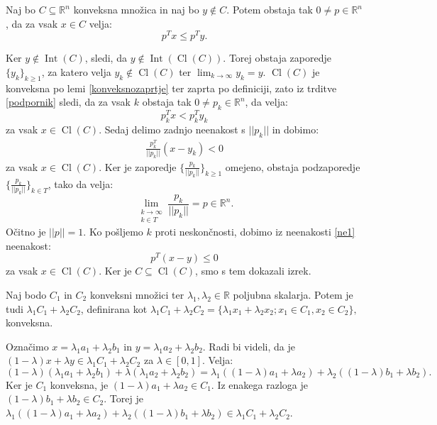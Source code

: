 \documentclass[mat1]{fmfdelo}
\newcommand{\R}{\mathbb R}
\DeclareMathOperator{\Int}{Int}
\DeclareMathOperator{\Cl}{Cl}
\begin{document}
\begin{izrek}
	Naj bo $C\subseteq \R^n$ konveksna množica in naj bo $y \notin C$. Potem obstaja tak $0 \ne p \in \R^n$, da za vsak $x \in C$ velja:
	$$ p^Tx \le p^Ty.$$
\end{izrek}

\begin{dokaz}
	Ker $y \notin \Int(C)$, sledi, da $y \notin \Int(\Cl(C))$. 
	Torej obstaja zaporedje $ \{y_k\}_{k\ge 1}$, za katero velja $y_k \notin \Cl(C)$ ter $\lim_{k \to \infty} y_k = y$. $\Cl(C)$ je konveksna po lemi \ref{konveksnozaprtje}
	ter zaprta po definiciji, zato iz trditve \ref{podpornik} sledi, da za vsak $k$ obstaja tak $0 \ne p_k \in \R^n$, da velja:
	$$ p_k^Tx < p_k^Ty_k$$ 
	za vsak $x \in \Cl(C)$. Sedaj delimo zadnjo neenakost s $||p_k||$ in dobimo: 
	\begin{align}\label{ne1}
	\frac{p_k^T}{||p_k||}(x-y_k)<0
	\end{align}
	za vsak $x \in \Cl(C)$. Ker je zaporedje $\{ \frac{p_k}{||p_k||}  \}_{k\ge1}$ omejeno, obstaja podzaporedje  $\{ \frac{p_k}{||p_k||}  \}_{k \in T}$, tako da velja:
	$$ \lim_{\substack{k \to \infty \\ k \in T}} \frac{p_k}{||p_k||} = p \in \R^n.$$
	Očitno je $||p|| = 1$. Ko pošljemo $k$ proti neskončnosti, dobimo iz neenakosti \eqref{ne1} neenakost: 
	$$ p^T(x-y) \le 0 $$
	za vsak $x \in \Cl(C)$. Ker je $C \subseteq \Cl(C)$, smo s tem dokazali izrek.  
\end{dokaz}

\begin{lema}\label{linkonv}
	Naj bodo $C_1$ in $C_2$ konveksni množici ter $\lambda_1, \lambda_2 \in \R$ poljubna skalarja. Potem je tudi $\lambda_1C_1 + \lambda_2 C_2$, definirana kot $\lambda_1C_1 + \lambda_2 C_2 = \{\lambda_1x_1 + \lambda_2x_2; x_1\in C_1, x_2 \in C_2	\},$ konveksna.  
\end{lema}

\begin{dokaz}
	Označimo  $x = \lambda_1 a_1 + \lambda_2 b_1$ in $y = \lambda_1 a_2 + \lambda_2 b_2$. Radi bi videli, da je $(1-\lambda)x + \lambda y \in \lambda_1C_1 + \lambda_2 C_2 $ za $\lambda \in [0,1]$. Velja: 
	$$(1-\lambda) (\lambda_1 a_1 + \lambda_2 b_1) + \lambda (\lambda_1 a_2 + \lambda_2 b_2) = \lambda_1((1-\lambda)a_1 + \lambda a_2) + \lambda_2((1-\lambda)b_1 + \lambda b_2). $$
	Ker je $C_1 $ konveksna, je $(1-\lambda)a_1 + \lambda a_2 \in C_1$. Iz enakega razloga je $(1-\lambda)b_1 + \lambda b_2 \in C_2$. Torej je $\lambda_1((1-\lambda)a_1 + \lambda a_2) + \lambda_2((1-\lambda)b_1 + \lambda b_2) \in  \lambda_1C_1 + \lambda_2 C_2$.
\end{dokaz}
\end{document}
